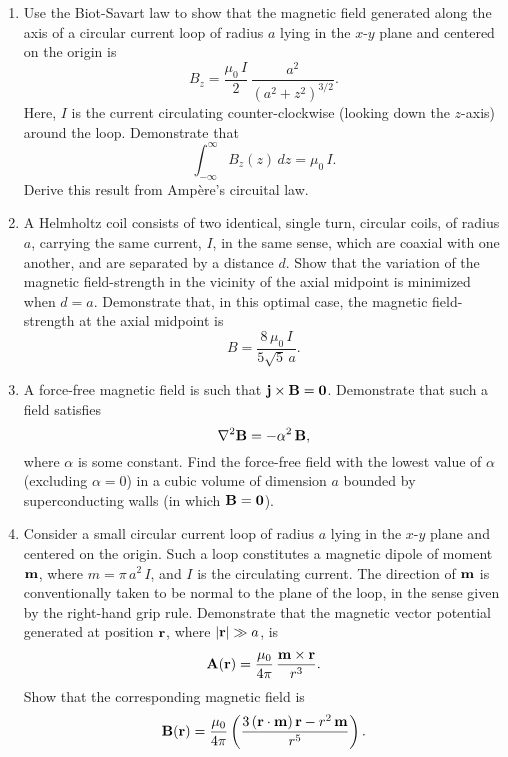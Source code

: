 {\begin{enumerate}
\begin{enumerate}
\item Find the magnetic field at the center of a square loop carrying a current
$I$. Let $r$ be the perpendicular distance from the center to one of the
sides of the loop.
\item Find the magnetic field at the center of a regular $n$-sided polygon carrying a current $I$. Let $r$ be the perpendicular distance from the center
to one of the sides of the loop. Check that your answer reduces to the answer
from part (a) in the limit $n\rightarrow\infty$.
\end{enumerate}
\item Use the Biot-Savart law to show that the magnetic field
generated along the axis of a circular current loop of radius $a$ lying in
the $x$-$y$ plane and centered on the origin is
$$
B_z = \frac{\mu_0\,I}{2}\,\frac{a^2}{(a^2+z^2)^{3/2}}.
$$
Here, $I$ is the current circulating counter-clockwise (looking down the
$z$-axis) around the loop. Demonstrate that
$$
\int_{-\infty}^{\infty} B_z(z)\,dz = \mu_0\,I.
$$
Derive this result from Amp\`{e}re's circuital law.
\item A Helmholtz coil consists of two identical, single turn, circular coils, of radius $a$,  carrying
the same current, $I$, in the same sense, which are coaxial with one another,
and are separated by a distance $d$. Show that the variation of the magnetic field-strength in the vicinity
of the axial midpoint is minimized when $d=a$. Demonstrate that, in this optimal case, the
magnetic field-strength at the axial midpoint is
$$
B = \frac{8\,\mu_0\,I}{5\sqrt{5}\,a}.
$$

\item A force-free magnetic field is such that ${\bf j}\times {\bf B} = {\bf 0}$. Demonstrate that such a field satisfies
$$
\nabla^2 {\bf B} = -\alpha^2\,{\bf B},
$$
where $\alpha$ is some constant. Find the force-free field with the lowest value of $\alpha$ (excluding $\alpha=0$) in a cubic volume of dimension $a$ bounded by superconducting walls (in which ${\bf B}={\bf 0}$).
\item Consider a small circular current loop of radius $a$ lying in the
$x$-$y$ plane and centered on the origin. Such a loop constitutes a magnetic
dipole  of moment ${\bf m}$, where $m=\pi\,a^2\,I$, and $I$ is the circulating current. The direction of ${\bf m}$ is conventionally taken to be
normal to the plane of the loop, in the sense given by the right-hand
grip rule. Demonstrate that the magnetic vector potential generated
at position ${\bf r}$, where $|{\bf r}|\gg a$, is
$$
{\bf A}({\bf r}) = \frac{\mu_0}{4\pi}\,\frac{{\bf m}\times {\bf r}}{r^3}.
$$
Show that the corresponding magnetic field is
$$
{\bf B}({\bf r}) = \frac{\mu_0}{4\pi}\left(\frac{3\,({\bf r}\cdot{\bf m})\,{\bf r}- r^2\,{\bf m}}{r^5}\right).
$$


\end{enumerate}}
